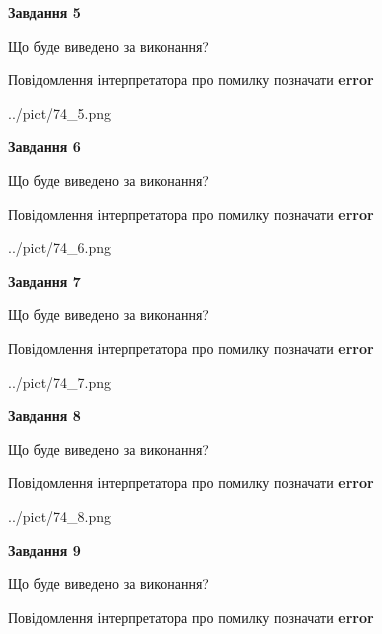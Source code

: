 \documentclass[11pt, ukrainian]{article}
\begin{document}
{\begin {large}
{\begin {center}\textbf{Завдання 5}\end {center}}\par
Що буде виведено за виконання? \par
Повідомлення інтерпретатора про помилку позначати \textbf{error}

\begin{center}
	{../pict/74_5.png}
\end{center}
\newpage

{\begin {center}\textbf{Завдання 6}\end {center}}\par
Що буде виведено за виконання? \par
Повідомлення інтерпретатора про помилку позначати \textbf{error}

\begin{center}
	{../pict/74_6.png}
\end{center}
\newpage

{\begin {center}\textbf{Завдання 7}\end {center}}\par
Що буде виведено за виконання? \par
Повідомлення інтерпретатора про помилку позначати \textbf{error}

\begin{center}
	{../pict/74_7.png}
\end{center}
\newpage

{\begin {center}\textbf{Завдання 8}\end {center}}\par
Що буде виведено за виконання? \par
Повідомлення інтерпретатора про помилку позначати \textbf{error}

\begin{center}
	{../pict/74_8.png}
\end{center}
\newpage

{\begin {center}\textbf{Завдання 9}\end {center}}\par
Що буде виведено за виконання? \par
Повідомлення інтерпретатора про помилку позначати \textbf{error}


\end{large}}
\end{document}
